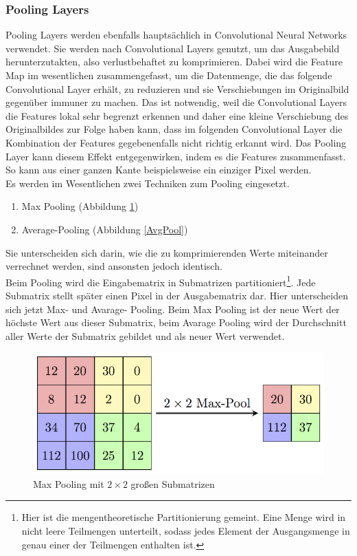 \documentclass[11pt]{article}
\begin{document}
\subsubsection{Pooling Layers}
Pooling Layers werden ebenfalls hauptsächlich in Convolutional Neural Networks verwendet. Sie werden nach Convolutional Layers genutzt, um das Ausgabebild herunterzutakten, also verlustbehaftet zu komprimieren. Dabei wird die Feature Map im wesentlichen zusammengefasst, um die Datenmenge, die das folgende Convolutional Layer erhält, zu reduzieren und sie Verschiebungen im Originalbild gegenüber immuner zu machen. Das ist notwendig, weil die Convolutional Layers die Features lokal sehr begrenzt erkennen und daher eine kleine Verschiebung des Originalbildes zur Folge haben kann, dass im folgenden Convolutional Layer die Kombination der Features gegebenenfalls nicht richtig erkannt wird. Das Pooling Layer kann diesem Effekt entgegenwirken, indem es die Features zusammenfasst. So kann aus einer ganzen Kante beispielsweise ein einziger Pixel werden.\\
Es werden im Wesentlichen zwei Techniken zum Pooling eingesetzt. 
\begin{enumerate}
	\item Max Pooling (Abbildung \ref{Maxpool})
	\item  Average-Pooling (Abbildung \ref{AvgPool})
\end{enumerate}
Sie unterscheiden sich darin, wie die zu komprimierenden Werte miteinander verrechnet werden, sind ansonsten jedoch identisch.\\
Beim Pooling wird die Eingabematrix in Submatrizen partitioniert\footnote{Hier ist die mengentheoretische Partitionierung gemeint. Eine Menge wird in nicht leere Teilmengen unterteilt, sodass jedes Element der Ausgangsmenge in genau einer der Teilmengen enthalten ist.}. Jede Submatrix stellt später einen Pixel in der Ausgabematrix dar. Hier unterscheiden sich jetzt Max- und Avarage- Pooling. Beim Max Pooling ist der neue Wert der höchste Wert aus dieser Submatrix, beim Avarage Pooling wird der Durchschnitt aller Werte der Submatrix gebildet und als neuer Wert verwendet.
\begin{figure}[h]
	\centering
	\includegraphics[width=0.7\linewidth]{../graphics/MaxpoolSample2.png}
	\caption[Max Pooling mit $2\times2$ großen Submatrizen\newline
	Quelle: https://computersciencewiki.org/index.php/Max-pooling\_/\_Pooling\\
	CC BY NC SA Lizenz]{Max Pooling mit $2\times2$ großen Submatrizen}
	\label{Maxpool}
\end{figure}
\end{document}
